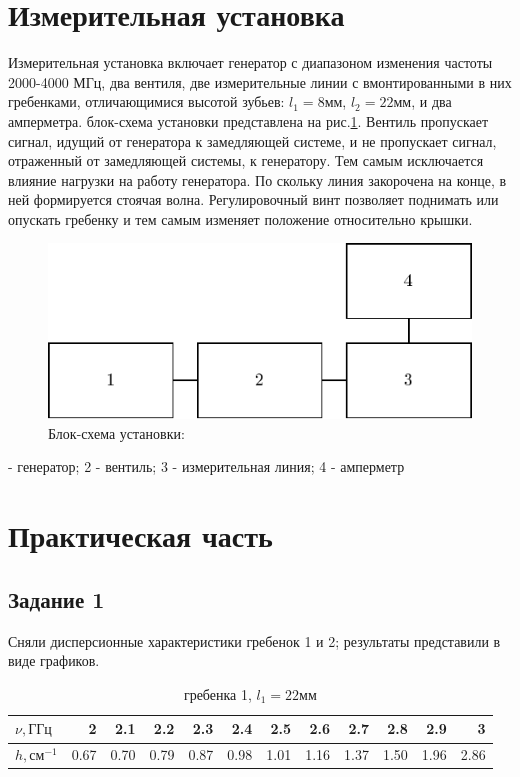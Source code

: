 \documentclass[a4paper,14pt]{extarticle}
\begin{document}
\section*{Измерительная установка}
Измерительная установка включает генератор с диапазоном изменения частоты 2000-4000 МГц, два вентиля, две измерительные линии с вмонтированными в них гребенками, отличающимися высотой зубьев: $l_1= 8 мм$, $l_2= 22 мм$, и два амперметра. блок-схема установки представлена на рис.\ref{pic2}. Вентиль пропускает сигнал, идущий от генератора к замедляющей системе, и не пропускает сигнал, отраженный от замедляющей системы, к генератору. Тем самым исключается влияние нагрузки на работу генератора. По скольку линия закорочена на конце, в ней формируется стоячая волна. Регулировочный винт позволяет поднимать или опускать гребенку и тем самым изменяет положение относительно крышки.
\begin{figure}[H]
	\centering
	\includegraphics[width=0.7\linewidth]{plots/pic2}
	\caption{Блок-схема установки: }
	\label{pic2}
\end{figure}
{ - генератор; 2 - вентиль; 3 - измерительная линия; 4 - амперметр}
\section*{Практическая часть}
\subsection*{Задание 1}
Сняли дисперсионные характеристики гребенок 1 и 2; результаты представили в виде графиков.

\begin{table}[htbp]
	\centering
	\caption{гребенка 1, $l_1 =22 \text{мм}$}
	\begin{tabular}{|l|r|r|r|r|r|r|r|r|r|r|r|}
		\hline
		$\nu, \text{ГГц}$ & 2     & 2.1   & 2.2   & 2.3   & 2.4   & 2.5   & 2.6   & 2.7   & 2.8   & 2.9   & 3 \\
		\hline
		$h, \text{см}^{-1}$ & 0.67  & 0.70  & 0.79  & 0.87  & 0.98  & 1.01  & 1.16  & 1.37  & 1.50  & 1.96  & 2.86 \\
		\hline
	\end{tabular}%
	\label{tab:addlabel}%
\end{table}%
\end{document}
